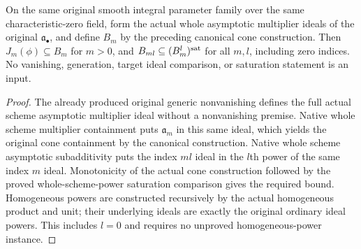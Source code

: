 \begin{proposition}
\label{prop:c0n-original-asymptotic-multiplier-cone}
\leanok
{}
On the same original smooth integral parameter family over the same
characteristic-zero field, form the actual whole asymptotic multiplier ideals
of the original $\mathfrak a_\bullet$, and define $B_m$ by the preceding
canonical cone construction. Then $J_m(\phi)\subseteq B_m$ for $m>0$, and
$B_{ml}\subseteq(B_m^l)^{\rm sat}$ for all $m,l$, including zero indices.
No vanishing, generation, target ideal comparison, or saturation statement
is an input.
\end{proposition}
\begin{proof}
The already produced original generic nonvanishing defines the full actual
scheme asymptotic multiplier ideal without a nonvanishing premise. Native
whole scheme multiplier containment puts $\mathfrak a_m$ in this same ideal,
which yields the original cone containment by the canonical construction.
Native whole scheme asymptotic subadditivity puts the index $ml$ ideal in the
$l$th power of the same index $m$ ideal. Monotonicity of the actual cone
construction followed by the proved whole-scheme-power saturation comparison
gives the required bound. Homogeneous powers are constructed recursively by
the actual homogeneous product and unit; their underlying ideals are exactly
the original ordinary ideal powers. This includes $l=0$ and requires no
unproved homogeneous-power instance.
\end{proof}

